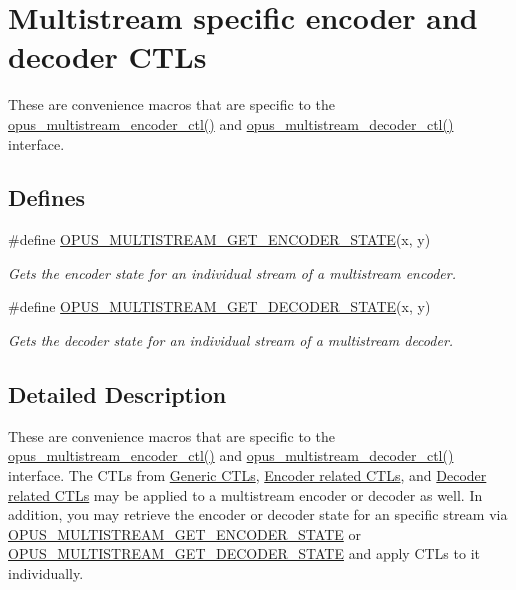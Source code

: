 \hypertarget{group__opus__multistream__ctls}{
\section{Multistream specific encoder and decoder CTLs}
\label{group__opus__multistream__ctls}
}


These are convenience macros that are specific to the \hyperlink{group__opus__multistream_gae14328330c548dede66c494f51e33707}{opus\_\-multistream\_\-encoder\_\-ctl()} and \hyperlink{group__opus__multistream_ga4b3dca8d46e5868cc133f3f6d2b57688}{opus\_\-multistream\_\-decoder\_\-ctl()} interface.  
\subsection*{Defines}
\begin{DoxyCompactItemize}
\item 
\#define \hyperlink{group__opus__multistream__ctls_ga4e67607eb691c4314a5de90d8c58aff0}{OPUS\_\-MULTISTREAM\_\-GET\_\-ENCODER\_\-STATE}(x, y)
\begin{DoxyCompactList}\small\item\em Gets the encoder state for an individual stream of a multistream encoder. \item\end{DoxyCompactList}\item 
\#define \hyperlink{group__opus__multistream__ctls_gaf0843831519b4d9b9d73391afef04a53}{OPUS\_\-MULTISTREAM\_\-GET\_\-DECODER\_\-STATE}(x, y)
\begin{DoxyCompactList}\small\item\em Gets the decoder state for an individual stream of a multistream decoder. \item\end{DoxyCompactList}\end{DoxyCompactItemize}


\subsection{Detailed Description}
These are convenience macros that are specific to the \hyperlink{group__opus__multistream_gae14328330c548dede66c494f51e33707}{opus\_\-multistream\_\-encoder\_\-ctl()} and \hyperlink{group__opus__multistream_ga4b3dca8d46e5868cc133f3f6d2b57688}{opus\_\-multistream\_\-decoder\_\-ctl()} interface. The CTLs from \hyperlink{group__opus__genericctls}{Generic CTLs}, \hyperlink{group__opus__encoderctls}{Encoder related CTLs}, and \hyperlink{group__opus__decoderctls}{Decoder related CTLs} may be applied to a multistream encoder or decoder as well. In addition, you may retrieve the encoder or decoder state for an specific stream via \hyperlink{group__opus__multistream__ctls_ga4e67607eb691c4314a5de90d8c58aff0}{OPUS\_\-MULTISTREAM\_\-GET\_\-ENCODER\_\-STATE} or \hyperlink{group__opus__multistream__ctls_gaf0843831519b4d9b9d73391afef04a53}{OPUS\_\-MULTISTREAM\_\-GET\_\-DECODER\_\-STATE} and apply CTLs to it individually. 

